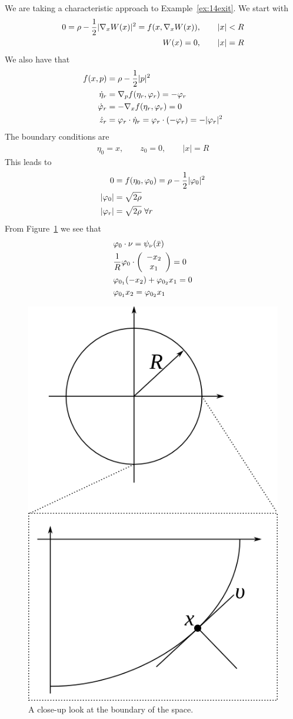 \begin{example}
We are taking a characteristic approach to Example~\ref{ex:14exit}.
We start with
\begin{align*}
0 = \rho - \frac{1}{2}|\nabla_xW(x)|^2 = f(x,\nabla_xW(x))&, \qquad |x|<R \\
W(x) = 0&, \qquad |x| = R
\end{align*}
We also have that
\begin{align*}
f(x,p) &= \rho-\frac{1}{2}|p|^2 \\
\dot{\eta}_r &= \nabla_p f(\eta_r,\varphi_r) = -\varphi_r \\
\dot{\varphi}_r &= -\nabla_x f(\eta_r,\varphi_r) = 0 \\
\dot{z}_r &= \varphi_r\cdot\dot{\eta}_r = \varphi_r\cdot(-\varphi_r) = -|\varphi_r|^2
\end{align*}
The boundary conditions are
\begin{align*}
\eta_0 = x, \qquad z_0=0, \qquad |x|=R
\end{align*}
This leads to
\begin{align}
\label{eq:15vpr}
0 &= f(\eta_0,\varphi_0) = \rho-\frac{1}{2}|\varphi_0|^2 \nonumber \\
|\varphi_0| &= \sqrt{2\rho} \nonumber \\
|\varphi_r| &= \sqrt{2\rho}~\forall r
\end{align}
From Figure~\ref{fig:15circlezoom} we see that
\begin{align}
\label{eq:15vpo}
&\varphi_0\cdot\nu = \psi_\nu(\bar{x}) \nonumber \\
&\frac{1}{R}\varphi_0\cdot\left(\begin{array}{c} -x_2 \\ x_1 \end{array}\right) = 0 \nonumber\\
&\varphi_{0_1} (-x_2) + \varphi_{0_2}x_1 = 0 \nonumber\\
&\varphi_{0_1}x_2 = \varphi_{0_2}x_1
\end{align}

\begin{figure}[ht!]
\centering
\includegraphics[width=.4\textwidth]{images/15circlezoom}
\caption{A close-up look at the boundary of the space.}
\label{fig:15circlezoom}
\end{figure}


\end{example}
